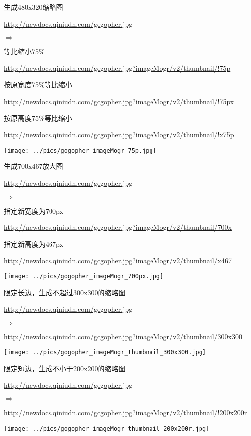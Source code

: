 \documentclass[11pt, oneside]{book}
\newcommand{\qhint}[1]{
\footnotesize
\vspace{0.2em}
\noindent
#1\par
\vspace{-0.5em}
\normalsize
}
\newcommand{\qsym}[1]{
\footnotesize
\noindent
#1\par
\normalsize
}
\newcommand{\qsamplelink}[1]{
\vspace{0.2em}
\noindent
#1\par
\vspace{0.1em}
}
\newcommand{\qurl}[1]{\footnotesize\url{#1}\normalsize}
\begin{document}
\begin{sample}
  \caption{生成480x320缩略图}
    \qsamplelink{\qurl{http://newdocs.qiniudn.com/gogopher.jpg}}
    \qsym{$\Rightarrow$}
    \qhint{等比缩小75\%}
    \qsamplelink{\qurl{http://newdocs.qiniudn.com/gogopher.jpg?imageMogr/v2/thumbnail/!75p}}
    \qhint{按原宽度75\%等比缩小}
    \qsamplelink{\qurl{http://newdocs.qiniudn.com/gogopher.jpg?imageMogr/v2/thumbnail/!75px}}
    \qhint{按原高度75\%等比缩小}
    \qsamplelink{\qurl{http://newdocs.qiniudn.com/gogopher.jpg?imageMogr/v2/thumbnail/!x75p}}

    \begin{center}
      \texttt{[image: ../pics/gogopher\_imageMogr\_75p.jpg]}
    \end{center}
  \label{imageMogr-thumbnail-75p}
\end{sample}

\begin{sample}
  \caption{生成700x467放大图}
    \qsamplelink{\qurl{http://newdocs.qiniudn.com/gogopher.jpg}}
    \qsym{$\Rightarrow$}
    \qhint{指定新宽度为700px}
    \qsamplelink{\qurl{http://newdocs.qiniudn.com/gogopher.jpg?imageMogr/v2/thumbnail/700x}}
    \qhint{指定新高度为467px}
    \qsamplelink{\qurl{http://newdocs.qiniudn.com/gogopher.jpg?imageMogr/v2/thumbnail/x467}}

    \begin{center}
      \texttt{[image: ../pics/gogopher\_imageMogr\_700px.jpg]}
    \end{center}
  \label{imageMogr-thumbnail-700px}
\end{sample}

\begin{sample}
  \caption{限定长边，生成不超过300x300的缩略图}
    \qsamplelink{\qurl{http://newdocs.qiniudn.com/gogopher.jpg}}
    \qsym{$\Rightarrow$}
    \qsamplelink{\qurl{http://newdocs.qiniudn.com/gogopher.jpg?imageMogr/v2/thumbnail/300x300}}

    \begin{center}
      \texttt{[image: ../pics/gogopher\_imageMogr\_thumbnail\_300x300.jpg]}
    \end{center}
  \label{imageMogr-thumbnail-300x300}
\end{sample}

\begin{sample}
  \caption{限定短边，生成不小于200x200的缩略图}
    \qsamplelink{\qurl{http://newdocs.qiniudn.com/gogopher.jpg}}
    \qsym{$\Rightarrow$}
    \qsamplelink{\qurl{http://newdocs.qiniudn.com/gogopher.jpg?imageMogr/v2/thumbnail/!200x200r}}

    \begin{center}
      \texttt{[image: ../pics/gogopher\_imageMogr\_thumbnail\_200x200r.jpg]}
    \end{center}
  \label{imageMogr-thumbnail-200x200r}
\end{sample}
\end{document}
